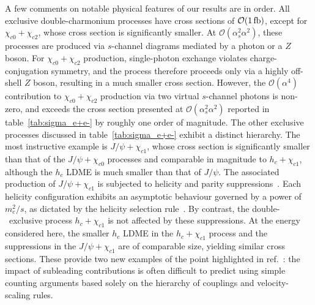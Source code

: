 A few comments on notable physical features of our results are in order.
All exclusive double-charmonium processes have cross sections of ${\cal O}(1\,{\rm fb})$, except for $\chi_{c0} + \chi_{c2}$, whose cross section is significantly smaller. At $\mathcal{O}(\alpha_s^2\alpha^2)$, these processes are produced via $s$-channel diagrams mediated by a photon or a $Z$ boson. For $\chi_{c0} + \chi_{c2}$ production, single-photon exchange violates charge-conjugation symmetry, and the process therefore proceeds only via a highly off-shell $Z$ boson, resulting in a much smaller cross section. However, the $\mathcal{O}(\alpha^4)$ contribution to $\chi_{c0} + \chi_{c2}$ production via two virtual $s$-channel photons is non-zero, and exceeds the cross section presented at $\mathcal{O}(\alpha_s^2\alpha^2)$ reported in table~\ref{tab:sigma_e+e-} by roughly one order of magnitude. 
The other exclusive processes discussed in table~\ref{tab:sigma_e+e-} exhibit a distinct hierarchy. The most instructive example is $J/\psi + \chi_{c1}$, whose cross section is significantly smaller than that of the $J/\psi + \chi_{c0}$ processes and comparable in magnitude to $h_c + \chi_{c1}$, although the $h_c$ LDME is much smaller than that of $J/\psi$. The associated production of $J/\psi + \chi_{c1}$ is subjected to helicity and parity suppressions~\cite{Dong:2011fb}. 
Each helicity configuration exhibits an asymptotic behaviour governed by a power of ${m_c^2}/{s}$, as dictated by the helicity selection rule~\cite{Brodsky:1981kj}.
By contrast, the double-\pwavetxt\ exclusive process $h_c + \chi_{c1}$ is not affected by these suppressions. At the energy considered here, the smaller $h_c$ LDME in the $h_c+\chi_{c1}$ process and the suppressions in the $J/\psi+\chi_{c1}$ are of comparable size, yielding similar cross sections.
These provide two new examples of the point highlighted in ref.~\cite{ColpaniSerri:2025vdz}: the impact of subleading contributions is often difficult to predict using simple counting arguments based solely on the hierarchy of couplings and velocity-scaling rules.

